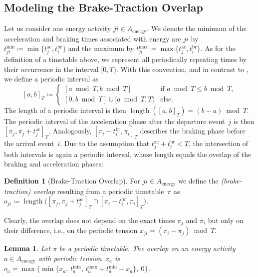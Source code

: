 \documentclass[11pt,a4paper]{article}
\newcommand{\energy}{\mathrm{energy}}
\newcommand{\possenergyact}{A_{\energy}} %
\newcommand{\ac}{\mathrm{ac}}
\newcommand{\br}{\mathrm{br}}
\newcommand{\length}{\operatorname{length}}
\newtheorem{lemma}[theorem]{Lemma}
\theoremstyle{definition}
\newtheorem{definition}[theorem]{Definition}
\theoremstyle{remark}
\begin{document}
\subsection{Modeling the Brake-Traction Overlap}
\label{ss:overlap}

Let us consider one energy activity $ji \in A_{\energy }$. We denote the minimum of the acceleration and braking times associated with energy arc $ji$ by $t_{ji}^{\min} \coloneqq \min \{ t_{j}^{\ac}, t_{i}^{\br} \} $ and the maximum by $t_{ji}^{\max} \coloneqq \max \{ t_{j}^{\ac}, t_{i}^{\br} \} $.
As for the definition of a timetable above, we represent all periodically repeating times by their occurrence in the interval $[0,T)$. With this convention, and in contrast to \cite{Serafini1989}, we define a periodic interval as
\[
[a, b]_T \coloneqq
\begin{cases}
	[a \bmod T, b \bmod T] &\text{if } a \bmod T \leq b \bmod T,\\
	[0, b \bmod T] \cup[ a \bmod T, T) &\text{else.}
\end{cases}
\]
The length of a periodic interval is then $\length([a, b]_T) = (b-a) \bmod T$. 
The periodic interval of the acceleration phase after the departure event~$j$ is then $[\pi_j, \pi_j + t_j^{\ac}]_T$. Analogously, $[\pi_i - t_i^{\br}, \pi_i]_T$ describes the braking phase before the arrival event~$i$. Due to the assumption that $t^{\ac}_j + t^{\br}_i < T$, the intersection of both intervals is again a periodic interval, whose length equals the overlap of the braking and acceleration phases:

\begin{definition}[Brake-Traction Overlap]\label{def:overlap}
	For $ji \in \possenergyact$
	we define the \emph{(brake-traction) overlap} resulting from a periodic timetable~$\pi$ as 
	$o_{ji} \coloneqq \length\bigl([\pi_j, \pi_j + t_j^{\ac}]_T \cap [\pi_i - t_i^{\br}, \pi_i]_T\bigr)$.
\end{definition}

Clearly, the overlap does not depend on the exact times $\pi_j$ and $\pi_i$ but only on their difference, i.e., on the periodic tension $x_{ji} =(\pi_i - \pi_j) \bmod{T}$. 

\begin{lemma} \label{lem:brake-traction-overlap}
    Let $\pi$ be a periodic timetable. The overlap on an energy activity~$a \in \possenergyact$ with periodic tension~$x_a$ is $o_a = \max\bigl\{ \min \{ x_a,\, t^{\min}_a,\, t^{\max}_a + t^{\min}_a - x_a\},\ 0\bigr\}$.
\end{lemma}
\end{document}
